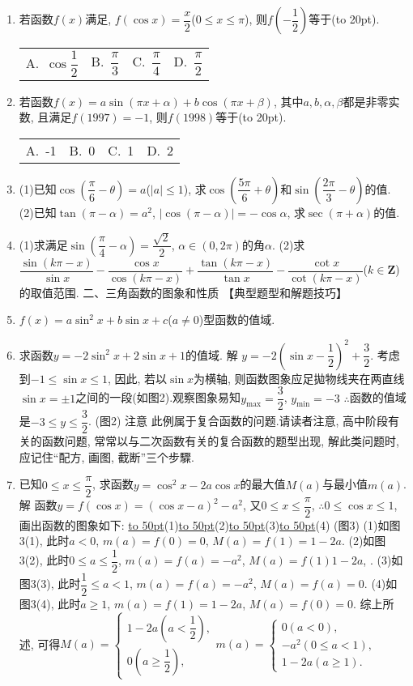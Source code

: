 \documentclass[10pt,a4paper]{article}
\newcommand{\blank}[1]{\underline{\hbox to #1pt{}}}
\newcommand{\bracket}[1]{(\hbox to #1pt{})}
\newcommand{\fourch}[4]{\par\begin{tabular}{p{.23\textwidth}p{.23\textwidth}p{.23\textwidth}p{.23\textwidth}}
A.~#1 &B.~#2& C.~#3& D.~#4
\end{tabular}}
\begin{document}
\begin{enumerate}[1.]
\item 若函数$f(x)$满足, $f(\cos x)=\dfrac x2$($0\le x\le \pi$), 则$f(-\dfrac 12)$等于\bracket{20}.
\fourch{$\cos \dfrac 12$}{$\dfrac{\pi }3$}{$\dfrac{\pi }4$}{$\dfrac{\pi }2$}
\item 若函数$f(x)=a\sin (\pi x+\alpha)+b\cos (\pi x+\beta)$, 其中$a,b,\alpha ,\beta$都是非零实数, 且满足$f(1997)=-1$, 则$f(1998)$等于\bracket{20}.
\fourch{-1}{0}{1}{2}
\item (1)已知$\cos (\dfrac{\pi }6-\theta)=a$($|a|\le 1$), 求$\cos (\dfrac{5\pi }6+\theta)$和$\sin (\dfrac{2\pi }3-\theta)$的值.
(2)已知$\tan (\pi -\alpha)=a^2$, $|\cos (\pi -\alpha)|=-\cos \alpha$, 求$\sec (\pi +\alpha)$的值.
\item (1)求满足$\sin (\dfrac{\pi }4-\alpha)=\dfrac{\sqrt 2}2$, $\alpha \in (0,2\pi)$的角$\alpha$.
(2)求$\dfrac{\sin (k\pi -x)}{\sin x}-\dfrac{\cos x}{\cos (k\pi -x)}+\dfrac{\tan (k\pi -x)}{\tan x}-\dfrac{\cot x}{\cot (k\pi -x)}$($k\in \mathbf{Z}$)的取值范围.
二、三角函数的图象和性质
【典型题型和解题技巧】
\item $f(x)=a\sin ^2x+b\sin x+c$($a\ne 0$)型函数的值域.
\item 求函数$y=-2\sin ^2x+2\sin x+1$的值域.
解  $y=-2(\sin x-\dfrac 12)^2+\dfrac 32$.
考虑到$-1\le \sin x\le 1$, 因此, 若以$\sin x$为横轴, 则函数图象应足拋物线夹在两直线$\sin x=\pm 1$之间的一段(如图2).观察图象易知$y_{\max }=\dfrac 32$, $y_{\min }=-3$
$\therefore$函数的值域是$-3\le y\le \dfrac 32$.
(图2)
注意  此例属于复合函数的问题.请读者注意, 高中阶段有关的函数问题, 常常以与二次函数有关的复合函数的题型出现, 解此类问题时, 应记住``配方, 画图, 截断''三个步驟.
\item 已知$0\le x\le \dfrac{\pi }2$, 求函数$y=\cos ^2x-2a\cos x$的最大值$M(a)$与最小值$m(a)$.
解  函数$y=f(\cos x)=(\cos x-a)^2-a^2$, 又$0\le x\le \dfrac{\pi }2$,
$\therefore 0\le \cos x\le 1$, 画出函数的图象如下:
\blank{50}(1)\blank{50}(2)\blank{50}(3)\blank{50}(4)
(图3)
(1)如图3(1), 此时$a<0$, $m(a)=f(0)=0$, $M(a)=f(1)=1-2a$.
(2)如图3(2), 此时$0\le a\le \dfrac 12$, $m(a)=f(a)=-a^2$, $M(a)=f(1)1-2a$, .
(3)如图3(3), 此时$\dfrac 12\le a<1$, $m(a)=f(a)=-a^2$, $M(a)=f(a)=0$.
(4)如图3(4), 此时$a\ge 1$, $m(a)=f(1)=1-2a$, $M(a)=f(0)=0$.
综上所述, 可得$M(a)=\begin{cases}
    1-2a  (a<\dfrac 12),  \\0  (a\ge \dfrac 12),  \end{cases} m(a)=\begin{cases}
    0  (a<0),  \\-a^2  (0\le a<1),  \\1-2a  (a\ge 1).  \end{cases}$

\end{enumerate}
\end{document}

